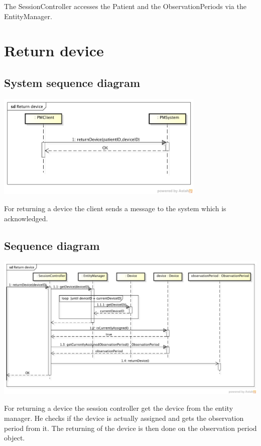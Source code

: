 \documentclass[fontsize=12pt,
               paper=a4,
               twoside=false,
               parskip=half,
               ]{scrartcl}
\begin{document}
The SessionController accesses the Patient and the ObservationPeriods via the EntityManager. 

\section{Return device}

\subsection{System sequence diagram}

\includegraphics[width=10cm]{./img/system-sequence-diagrams/return-device.png}

For returning a device the client sends a message to the system which is acknowledged.

\subsection{Sequence diagram}

\includegraphics[width=15cm]{./img/sequence-diagrams/return-device.png}

For returning a device the session controller get the device from the entity manager. He checks if the device is actually assigned and gets the observation period from it. The returning of the device is then done on the observation period object.
\end{document}
